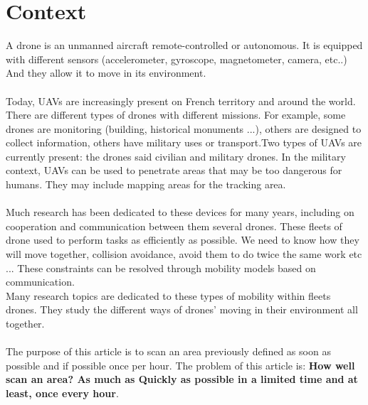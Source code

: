 \chapter{Context}

A drone is an unmanned aircraft remote-controlled or autonomous. It is equipped with different sensors (accelerometer, gyroscope, magnetometer, camera, etc..) And they allow it to move in its environment.\\\\

Today, UAVs are increasingly present on French territory and around the world. There are different types of drones with different missions. For example, some drones are monitoring (building, historical monuments ...), others are designed to collect information, others have military uses or transport.Two types of UAVs are currently present: the drones said civilian and military drones. In the military context, UAVs can be used to penetrate areas that may be too dangerous for humans. They may include mapping areas for the tracking area.\\\\

Much research has been dedicated to these devices for many years, including on cooperation and communication between them several drones. These fleets of drone used to perform tasks as efficiently as possible. We need to know how they will move together, collision avoidance, avoid them to do twice the same work etc ... These constraints can be resolved through mobility models based on communication.\\
Many research topics are dedicated to these types of mobility within fleets drones. They study the different ways of drones' moving in their environment all together.\\\\

The purpose of this article is to scan an area previously defined as soon as possible and if possible once per hour. The problem of this article is:
\textbf{How well scan an area? As much as Quickly as possible in a limited time and at least, once every hour}.